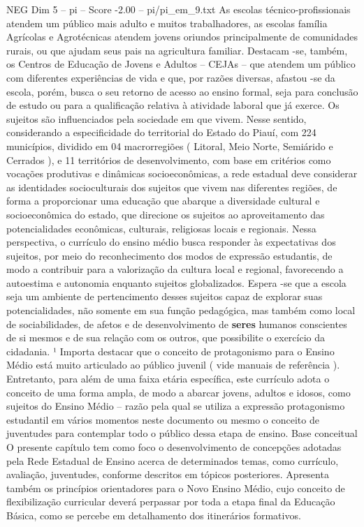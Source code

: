 \begin{textsample}{NEG Dim 5 – pi – Score -2.00 – pi/pi\_em\_9.txt}
As escolas técnico-profissionais atendem um público mais adulto e muitos trabalhadores, as escolas família Agrícolas e Agrotécnicas atendem jovens oriundos principalmente de comunidades rurais, ou que ajudam seus pais na agricultura familiar.
Destacam -se, também, os Centros de Educação de Jovens e Adultos – CEJAs – que atendem um público com diferentes experiências de vida e que, por razões diversas, afastou -se da escola, porém, busca o seu retorno de acesso ao ensino formal, seja para conclusão de estudo ou para a qualificação relativa à atividade laboral que já exerce.
Os sujeitos são influenciados pela sociedade em que vivem.
Nesse sentido, considerando a especificidade do territorial do Estado do Piauí, com 224 municípios, dividido em 04 macrorregiões ( Litoral, Meio Norte, Semiárido e Cerrados ), e 11 territórios de desenvolvimento, com base em critérios como vocações produtivas e dinâmicas socioeconômicas, a rede estadual deve considerar as identidades socioculturais dos sujeitos que vivem nas diferentes regiões, de forma a proporcionar uma educação que abarque a diversidade cultural e socioeconômica do estado, que direcione os sujeitos ao aproveitamento das potencialidades econômicas, culturais, religiosas locais e regionais.
Nessa perspectiva, o currículo do ensino médio busca responder às expectativas dos sujeitos, por meio do reconhecimento dos modos de expressão estudantis, de modo a contribuir para a valorização da cultura local e regional, favorecendo a autoestima e autonomia enquanto sujeitos globalizados.
Espera -se que a escola seja um ambiente de pertencimento desses sujeitos capaz de explorar suas potencialidades, não somente em sua função pedagógica, mas também como local de sociabilidades, de afetos e de desenvolvimento de \textbf{seres} humanos conscientes de si mesmos e de sua relação com os outros, que possibilite o exercício da cidadania. ¹ Importa destacar que o conceito de protagonismo para o Ensino Médio está muito articulado ao público juvenil ( vide manuais de referência ).
Entretanto, para além de uma faixa etária específica, este currículo adota o conceito de uma forma ampla, de modo a abarcar jovens, adultos e idosos, como sujeitos do Ensino Médio – razão pela qual se utiliza a expressão protagonismo estudantil em vários momentos neste documento ou mesmo o conceito de juventudes para contemplar todo o público dessa etapa de ensino.
Base conceitual O presente capítulo tem como foco o desenvolvimento de concepções adotadas pela Rede Estadual de Ensino acerca de determinados temas, como currículo, avaliação, juventudes, conforme descritos em tópicos posteriores.
Apresenta também os princípios orientadores para o Novo Ensino Médio, cujo conceito de flexibilização curricular deverá perpassar por toda a etapa final da Educação Básica, como se percebe em detalhamento dos itinerários formativos.

\end{textsample}
